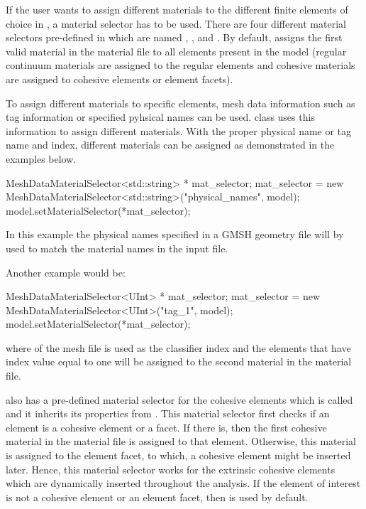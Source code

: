 If the user wants to assign different materials to the different
finite elements of choice in \akantu, a material selector has to be
used. There are four different material selectors pre-defined in
\akantu which are named ,
,  and
. By default, \akantu assigns
the first valid material in the material file to all elements present
in the model (regular continuum materials are assigned to the regular
elements and cohesive materials are assigned to cohesive elements or
element facets).

To assign different materials to specific elements, mesh data
information such as tag information or specified pyhsical names can be
used.  class uses this information to
assign different materials. With the proper physical name or tag name
and index, different materials can be assigned as demonstrated in the
examples below.

\begin{cpp}
  MeshDataMaterialSelector<std::string> * mat_selector;
  mat_selector = new MeshDataMaterialSelector<std::string>("physical_names", model);
  model.setMaterialSelector(*mat_selector);
\end{cpp}

In this example the physical names specified in a GMSH geometry file will by
used to match the material names in the input file.

Another example would be:

\begin{cpp}
  MeshDataMaterialSelector<UInt> * mat_selector;
  mat_selector = new MeshDataMaterialSelector<UInt>("tag_1", model);
  model.setMaterialSelector(*mat_selector);
\end{cpp}

where  of the mesh file is used as the classifier index
and the elements that have index value equal to one will be assigned
to the second material in the material file.

\akantu also has a pre-defined material selector for the cohesive
elements which is called  and it
inherits its properties from . This
material selector first checks if an element is a cohesive element or
a facet. If there is, then the first cohesive material in the material
file is assigned to that element. Otherwise, this material is assigned
to the element facet, to which, a cohesive element might be inserted
later. Hence, this material selector works for the extrinsic cohesive
elements which are dynamically inserted throughout the analysis. If
the element of interest is not a cohesive element or an element facet,
then  is used by default.

